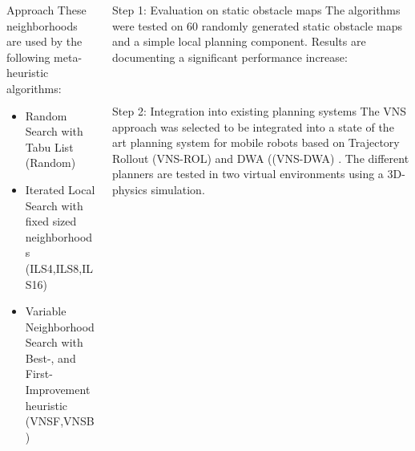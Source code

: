 \documentclass[final,hyperref={pdfpagelabels=true}]{beamer}
\begin{document}
\begin{frame}
\begin{columns}[t]
\begin{column}{.45\textwidth}
\begin{block}{Approach}
      These neighborhoods are used by the following meta-heuristic algorithms: 
      \begin{itemize}
        \item Random Search with Tabu List (Random)
 		\item Iterated Local Search with fixed sized neighborhoods (ILS4,ILS8,ILS16)
 		\item Variable Neighborhood Search with Best-, and First-Improvement heuristic (VNSF,VNSB)
       \end{itemize}
        \end{block}  
                     
    \end{column}

    \begin{column}{.45\textwidth}             
      \begin{block}{Step 1: Evaluation on static obstacle maps}
       The algorithms were tested on 60 randomly generated static obstacle maps and a simple local planning component.
       Results are documenting a significant performance increase:
       \begin{figure}
         \captionsetup[subfigure]{labelformat=empty} 
         \\
       \end{figure}
      \end{block}

      \begin{block}{Step 2: Integration into existing planning systems}
        The VNS approach was selected to be integrated into a state of the art planning system for mobile robots based on Trajectory Rollout (VNS-ROL) and DWA ((VNS-DWA) \cite{DBLP:conf/icra/Marder-EppsteinBFGK10}. The different planners are tested in two virtual environments using a 3D-physics simulation.
       \begin{figure}
         \captionsetup[subfigure]{labelformat=empty} 
       \end{figure}
       

\end{block}
\end{column}
\end{columns}
\end{frame}
\end{document}
